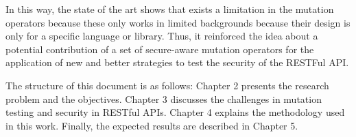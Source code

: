 In this way, the state of the art shows that exists a limitation in the mutation operators because these only works in limited backgrounds because their design is only for a specific language or library. Thus, it reinforced the idea about a potential contribution of a set of secure-aware mutation operators for the application of new and better strategies to test the security of the RESTFul API.

The structure of this document is as follows: Chapter 2 presents the research problem and the objectives. Chapter 3 discusses the challenges in mutation testing and security in RESTful APIs. Chapter 4 explains the methodology used in this work. Finally, the expected results are described in Chapter 5.
